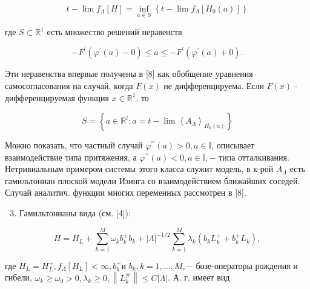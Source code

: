 \documentclass[10pt]{article}
\begin{document}
\[

t-\lim f_{\Lambda}[H]=\inf _{a \in S}\left\{t-\lim f_{\Lambda}\left[H_{0}(a)\right]\right\}

\]



где $S \subset \mathbb{R}^{1}$ есть множество решений неравенств



\[

-F^{\prime}\left(\varphi^{\prime}(a)-0\right) \leqslant a \leqslant-F^{\prime}\left(\varphi^{\prime}(a)+0\right) .

\]



Эти неравенства впервые получены в [8] как обобщение уравнения самосогласования на случай, когда $F(x)$ не дифференцируема. Если $F(x)$ - дифференцируемая функция $x \in \mathbb{R}^{1}$, то



\[

S=\left\{a \in \mathbb{R}^{l}: a=t-\lim \left\langle A_{\Lambda}\right\rangle_{H_{0}(a)}\right\}

\]



Можно показать, что частный случай $\varphi^{\prime \prime}(a)>0, a \in \mathbb{I}$, описывает взаимодействие типа притяжения, а $\varphi^{\prime \prime}(a)<0, a \in \mathbb{I},-$ типа отталкивания. Нетривиальным примером системы этого класса служит модель, в к-рой $A_{\Lambda}$ есть гамильтониан плоской модели Изинга со взаимодействием ближайших соседей. Случай аналитич. функции многих переменных рассмотрен в [8].



\begin{enumerate}

  \setcounter{enumi}{2}

  \item Гамильтонианы вида (см. [4]):

\end{enumerate}



\[

H=H_{L}+\sum_{k=1}^{M} \omega_{k} b_{k}^{+} b_{k}+|\Lambda|^{-1 / 2} \sum_{k=1}^{M} \lambda_{k}\left(b_{k} L_{k}^{+}+b_{k}^{+} L_{k}\right),

\]



где $H_{L}=H_{L}^{+}, f_{\Lambda}\left[H_{L}\right]<\infty, b_{k}^{+}$и $b_{k}, k=1, \ldots, M,-$ бозе-операторы рождения и гибели, $\omega_{k} \geqslant \omega_{0}>0, \lambda_{k} \geqslant 0,\left\|L_{k}^{\#}\right\| \leqslant C|\Lambda|$. А. г. имеет вид
\end{document}
